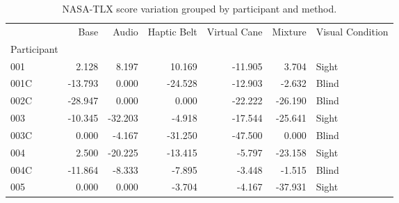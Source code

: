 
\begin{table}[!htb]
\centering
\caption{NASA-TLX score variation grouped by participant and method.}
\label{tab:nasa_var}
\begin{tabular}{lrrrrrl}
\toprule
{} &    Base &   Audio &  Haptic Belt &  Virtual Cane &  Mixture & Visual Condition \\
Participant &         &         &              &               &          &                  \\
\midrule
001         &   2.128 &   8.197 &       10.169 &       -11.905 &    3.704 &            Sight \\
001C        & -13.793 &   0.000 &      -24.528 &       -12.903 &   -2.632 &            Blind \\
002C        & -28.947 &   0.000 &        0.000 &       -22.222 &  -26.190 &            Blind \\
003         & -10.345 & -32.203 &       -4.918 &       -17.544 &  -25.641 &            Sight \\
003C        &   0.000 &  -4.167 &      -31.250 &       -47.500 &    0.000 &            Blind \\
004         &   2.500 & -20.225 &      -13.415 &        -5.797 &  -23.158 &            Sight \\
004C        & -11.864 &  -8.333 &       -7.895 &        -3.448 &   -1.515 &            Blind \\
005         &   0.000 &   0.000 &       -3.704 &        -4.167 &  -37.931 &            Sight \\
\bottomrule
\end{tabular}
\end{table}

